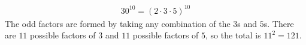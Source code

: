 \begin{align*}
30^{10} = (2 \cdot 3 \cdot 5)^{10}
\end{align*}
The odd factors are formed by taking any combination of the $3$s and $5$s.
There are $11$ possible factors of $3$ and $11$ possible factors of $5$, so the total is $11^{2}=121$.


